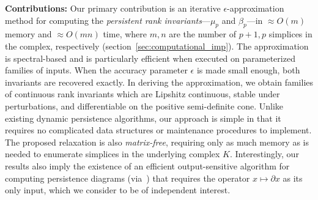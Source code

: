 \documentclass[10pt]{article}
\numberwithin{equation}{section}
\newcommand{\+}{%
	\raisebox{0.18ex}{\scaleobj{0.55}{+}}
}
\theoremstyle{definition}
\theoremstyle{definition}
\begin{document}
\noindent 
\textbf{Contributions:}
Our primary contribution is an iterative $\epsilon$-approximation method for computing the \emph{persistent rank invariants}---$\mu_p$ and $\beta_p$---in $\approx O(m)$ memory and $\approx O(mn)$ time, where $m, n$ are the number of $p+1, p$ simplices in the complex, respectively (section~\ref{sec:computational_imp}). 
The approximation is spectral-based and is particularly efficient when executed on parameterized families of inputs. 
When the accuracy parameter $\epsilon$ is made small enough, both invariants are recovered exactly. 
In deriving the approximation, we obtain families of continuous rank invariants which are Lipshitz continuous, stable under perturbations, and differentiable on the positive semi-definite cone. 
Unlike existing dynamic persistence algorithms, our approach is simple in that it requires no complicated data structures or maintenance procedures to implement. 
The proposed relaxation is also \emph{matrix-free}, requiring only as much memory as is needed to enumerate simplices in the underlying complex $K$.
Interestingly, our results also imply the existence of an efficient output-sensitive algorithm for computing persistence diagrams (via~\cite{chen2011output}) that requires the operator $x \mapsto \partial x$ as its only input, which we consider to be of independent interest. 
\end{document}
